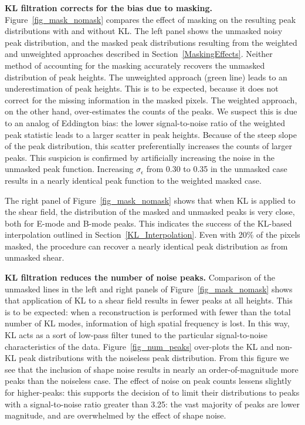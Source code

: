 \textbf{KL filtration corrects for the bias due to masking.}
Figure~\ref{fig_mask_nomask} compares the effect of masking on the
resulting peak distributions with and without KL.  The left panel
shows the unmasked noisy peak distribution, and the masked
peak distributions resulting from the weighted and unweighted
approaches described in Section~\ref{MaskingEffects}.  
Neither method of accounting for the masking accurately 
recovers the unmasked distribution of peak heights. The unweighted
approach (green line) leads to an underestimation of peak heights.  
This is to be expected, because it does not correct for the missing 
information in the masked pixels.  The weighted approach, on the other
hand, over-estimates the counts of the peaks.  We suspect
this is due to an analog of Eddington bias: the lower signal-to-noise 
ratio of the weighted peak statistic leads to a larger scatter in peak heights.
Because of the steep slope of the peak distribution, this scatter 
preferentially increases the counts of larger peaks.  This suspicion is
confirmed by artificially increasing the noise in the unmasked peak function.
Increasing $\sigma_\epsilon$ from 0.30 to 0.35 in the unmasked case
results in a nearly identical peak function to the weighted masked case.

The right panel of Figure~\ref{fig_mask_nomask} shows that when 
KL is applied to the shear field, the distribution of the masked and
unmasked peaks is very close, both for E-mode and B-mode peaks.
This indicates the success of the KL-based interpolation outlined in
Section~\ref{KL_Interpolation}.  Even with 20\% of the pixels masked,
the procedure can recover a nearly identical peak distribution as 
from unmasked shear.

\textbf{KL filtration reduces the number of noise peaks.}
Comparison of the unmasked lines in the left and right panels of 
Figure~\ref{fig_mask_nomask} shows that application of KL to a shear
field results in fewer peaks at all heights.  This is to be expected:
when a reconstruction is performed with fewer than the total number
of KL modes, information of high spatial frequency is lost.  In this
way, KL acts as a sort of low-pass filter tuned to the particular
signal-to-noise characteristics of the data.  Figure~\ref{fig_num_peaks}
over-plots the KL and non-KL peak distributions with the noiseless
peak distribution.  From this figure we see that the inclusion of
shape noise results in nearly an order-of-magnitude more peaks than 
the noiseless case.  The effect of noise on peak counts lessens slightly 
for higher-\Map peaks: this supports the decision of \citet{Dietrich10} 
to limit their distributions to peaks with a signal-to-noise 
ratio greater than 3.25: the vast majority of peaks are lower 
magnitude, and are overwhelmed by the effect of shape noise.

